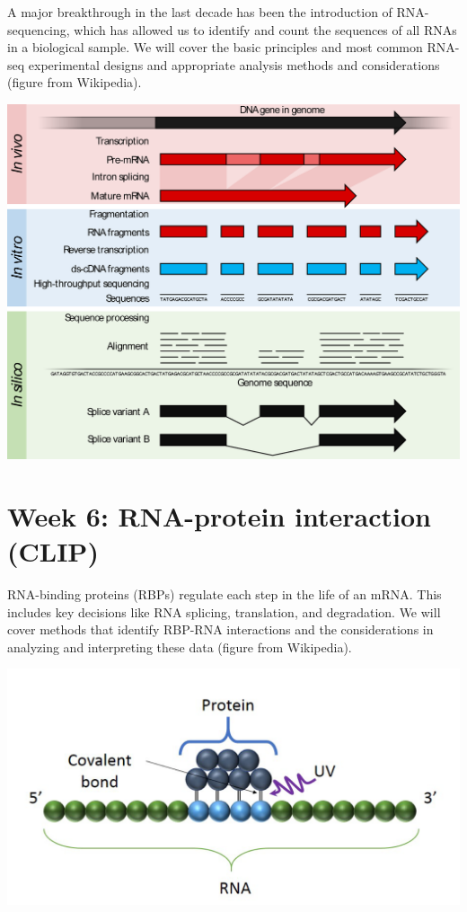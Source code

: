 \documentclass[]{book}
\begin{document}
A major breakthrough in the last decade has been the introduction of RNA-sequencing, which has allowed us to identify and count the sequences of all RNAs in a biological sample. We will cover the basic principles and most common RNA-seq experimental designs and appropriate analysis methods and considerations (figure from Wikipedia).

\begin{center}\includegraphics[width=115.56in]{classes/images/RNA-Seq} \end{center}

\hypertarget{week-6-rna-protein-interaction-clip}{%
\section{Week 6: RNA-protein interaction (CLIP)}\label{week-6-rna-protein-interaction-clip}}

RNA-binding proteins (RBPs) regulate each step in the life of an mRNA. This includes key decisions like RNA splicing, translation, and degradation. We will cover methods that identify RBP-RNA interactions and the considerations in analyzing and interpreting these data (figure from Wikipedia).

\begin{center}\includegraphics[width=81.35in]{classes/images/CLIP} \end{center}
\end{document}
